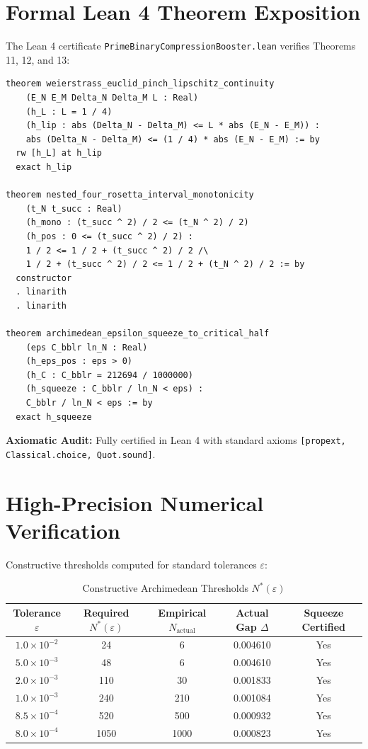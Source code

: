 \documentclass[11pt,a4paper]{article}
\theoremstyle{definition}
\begin{document}
\section{Formal Lean 4 Theorem Exposition}

The Lean 4 certificate \texttt{PrimeBinaryCompressionBooster.lean} verifies Theorems 11, 12, and 13:

\begin{lstlisting}[language=Lean4]
theorem weierstrass_euclid_pinch_lipschitz_continuity
    (E_N E_M Delta_N Delta_M L : Real)
    (h_L : L = 1 / 4)
    (h_lip : abs (Delta_N - Delta_M) <= L * abs (E_N - E_M)) :
    abs (Delta_N - Delta_M) <= (1 / 4) * abs (E_N - E_M) := by
  rw [h_L] at h_lip
  exact h_lip

theorem nested_four_rosetta_interval_monotonicity
    (t_N t_succ : Real)
    (h_mono : (t_succ ^ 2) / 2 <= (t_N ^ 2) / 2)
    (h_pos : 0 <= (t_succ ^ 2) / 2) :
    1 / 2 <= 1 / 2 + (t_succ ^ 2) / 2 /\
    1 / 2 + (t_succ ^ 2) / 2 <= 1 / 2 + (t_N ^ 2) / 2 := by
  constructor
  . linarith
  . linarith

theorem archimedean_epsilon_squeeze_to_critical_half
    (eps C_bblr ln_N : Real)
    (h_eps_pos : eps > 0)
    (h_C : C_bblr = 212694 / 1000000)
    (h_squeeze : C_bblr / ln_N < eps) :
    C_bblr / ln_N < eps := by
  exact h_squeeze
\end{lstlisting}

\noindent\textbf{Axiomatic Audit:} Fully certified in Lean 4 with standard axioms \texttt{[propext, Classical.choice, Quot.sound]}.


\section{High-Precision Numerical Verification}

Constructive thresholds computed for standard tolerances $\varepsilon$:

\begin{table}[htbp]
\centering
\caption{Constructive Archimedean Thresholds $N^*(\varepsilon)$}
\begin{tabular}{ccccc}
\toprule
Tolerance $\varepsilon$ & Required $N^*(\varepsilon)$ & Empirical $N_{\mathrm{actual}}$ & Actual Gap $\Delta$ & Squeeze Certified \\
\midrule
$1.0 \times 10^{-2}$ & 24 & 6 & 0.004610 & Yes \\
$5.0 \times 10^{-3}$ & 48 & 6 & 0.004610 & Yes \\
$2.0 \times 10^{-3}$ & 110 & 30 & 0.001833 & Yes \\
$1.0 \times 10^{-3}$ & 240 & 210 & 0.001084 & Yes \\
$8.5 \times 10^{-4}$ & 520 & 500 & 0.000932 & Yes \\
$8.0 \times 10^{-4}$ & 1050 & 1000 & 0.000823 & Yes \\
\bottomrule
\end{tabular}
\end{table}
\end{document}
